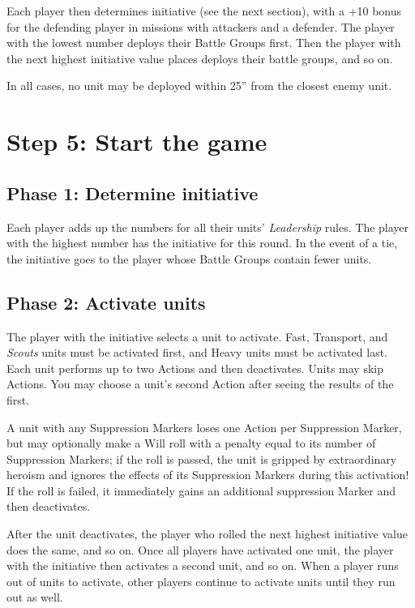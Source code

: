 \begin{multicols}{2}
Each player then determines initiative (see the next section), with a +10 bonus for the defending player in missions with attackers and a defender. The player with the lowest number deploys their Battle Groups first. Then the player with the next highest initiative value places deploys their battle groups, and so on.

In all cases, no unit may be deployed within 25'' from the closest enemy unit.





\section*{Step 5: Start the game}

\subsection*{Phase 1: Determine initiative}

Each player adds up the numbers for all their units' \textit{Leadership} rules. The player with the highest number has the initiative for this round. In the event of a tie, the initiative goes to the player whose Battle Groups contain fewer units.

\subsection*{Phase 2: Activate units}

The player with the initiative selects a unit to activate. Fast, Transport, and \textit{Scouts} units must be activated first, and Heavy units must be activated last. Each unit performs up to two Actions and then deactivates. Units may skip Actions. You may choose a unit's second Action after seeing the results of the first.

A unit with any Suppression Markers loses one Action per Suppression Marker, but may optionally make a Will roll with a penalty equal to its number of Suppression Markers; if the roll is passed, the unit is gripped by extraordinary heroism and ignores the effects of its Suppression Markers during this activation! If the roll is failed, it immediately gains an additional suppression Marker and then deactivates.

After the unit deactivates, the player who rolled the next highest initiative value does the same, and so on. Once all players have activated one unit, the player with the initiative then activates a second unit, and so on. When a player runs out of units to activate, other players continue to activate units until they run out as well.



\end{multicols}

